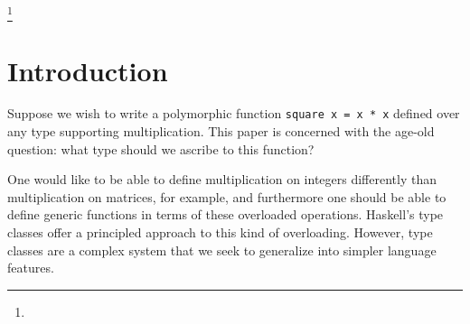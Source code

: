 \documentclass[acmlarge]{acmart}
\begin{document}
\newcommand\tmono{\tau}
\newcommand\tpoly{\sigma}
\newcommand\tvarempty{\epsilon_{\tpoly}}
\newcommand\tconst{\kappa}
\newcommand\tvar{\alpha}
\newcommand\tarrow[2]{#1 \rightarrow #2}
\newcommand\tforall[2]{\forall #1 \ . \ #2}
\newcommand\timp[2]{#1 \Rightarrow #2}
\newcommand\tforallimp[3]{\tforall{#1}{\timp{#2}{#3}}}
\newcommand\tgen[3]{\text{gen}\parens{#1, #2, #3}}
\newcommand\tinst[1]{\text{inst}(#1)}
\newcommand\tmgu[2]{\text{mgu}\parens{#1, #2}}

\newcommand\gcontext{\Gamma}
\newcommand\gempty{\epsilon_{\gcontext}}

\newcommand\icontext{\Delta}
\newcommand\iempty{\epsilon_{\icontext}}

\newcommand\sub[3]{#1 \left[ #2 \mapsto #3 \right]}
\newcommand\ssub{\theta}
\newcommand\sempty{\epsilon_{\ssub}}
\newcommand\slub[2]{#1 \vee #2}

\newcommand\utrans[2]{#1 \leadsto #2}
\newcommand\ttrans[2]{#1 \leadsto #2}
\newcommand\uelab[2]{#1 \hookrightarrow #2}
\newcommand\utovar[1]{\| #1 \|}



\terms{}



\thanks{
}


\maketitle

\section{Introduction}

  Suppose we wish to write a polymorphic function {\tt square x = x * x} defined over any type supporting multiplication. This paper is concerned with the age-old question: what type should we ascribe to this function?

  One would like to be able to define multiplication on integers differently than multiplication on matrices, for example, and furthermore one should be able to define generic functions in terms of these overloaded operations. Haskell's type classes \cite{typeclasses} offer a principled approach to this kind of overloading. However, type classes are a complex system that we seek to generalize into simpler language features.
\end{document}
